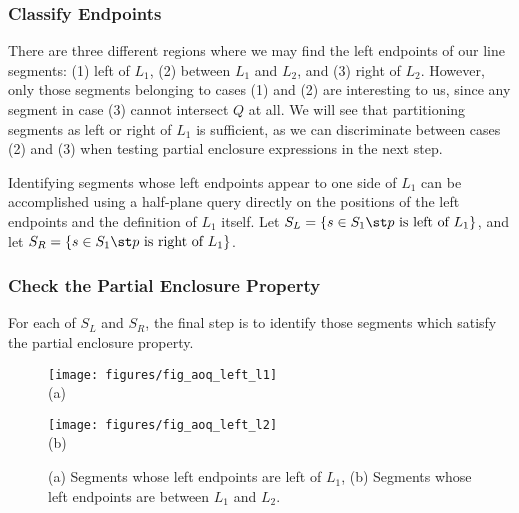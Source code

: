 \subsubsection{Classify Endpoints}
\label{:slabs:one:details:classify}

There are three different regions where we may find the left endpoints of our line segments: (1) left of $L_1$, (2) between $L_1$ and $L_2$, and (3) right of $L_2$.
However, only those segments belonging to cases (1) and (2) are interesting to us, since any segment in case (3) cannot intersect $Q$ at all. 
We will see that partitioning segments as left or right of $L_1$ is sufficient, as we can discriminate between cases (2) and (3) when testing partial enclosure expressions in the next step.

Identifying segments whose left endpoints appear to one side of $L_1$ can be accomplished using a half-plane query directly on the positions of the left endpoints and the definition of $L_1$ itself.
Let $S_L = \{ s \in S_1 \st p \text{ is left of } L_1 \}$, and let $S_R = \{ s \in S_1 \st p \text{ is right of } L_1 \}$.


\subsubsection{Check the Partial Enclosure Property}
\label{:slabs:one:details:pep}

For each of $S_L$ and $S_R$, the final step is to identify those segments which satisfy the partial enclosure property.

\begin{figure}[h]
\begin{minipage}[b]{0.5\linewidth}
\centering
\texttt{[image: figures/fig\_aoq\_left\_l1]}\\
(a)
\end{minipage}
\begin{minipage}[b]{0.5\linewidth}
\centering
\texttt{[image: figures/fig\_aoq\_left\_l2]}\\
(b)
\end{minipage}
\caption{(a) Segments whose left endpoints are left of $L_1$, (b) Segments whose left endpoints are between $L_1$ and $L_2$.}
\label{fig:slabs:one:aoq_left_l1_l1l2}
\end{figure}


